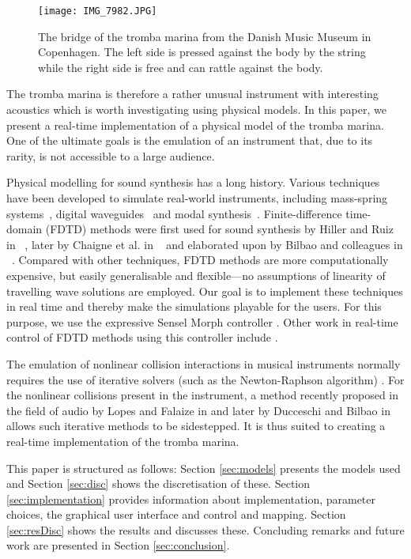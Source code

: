 \documentclass[dvipsnames, pdftex]{article}
\begin{document}
  \begin{figure}
  \centering
  \texttt{[image: IMG\_7982.JPG]}
  \caption{The bridge of the tromba marina from the Danish Music Museum in Copenhagen. The left side is pressed against the body by the string while the right side is free and can rattle against the body.}
  \label{fig:bridge}
\end{figure}

The tromba marina is therefore a rather unusual instrument with interesting acoustics which is worth investigating using  physical models. In this paper, we present a real-time implementation of a physical model of the tromba marina. One of the ultimate goals is the emulation of an instrument that, due to its rarity, is not accessible to a large audience.

Physical modelling for sound synthesis has a long history. Various techniques have been developed to simulate real-world instruments, including mass-spring systems~\cite{cadoz79}, digital waveguides~\cite{smith1992physical} and modal synthesis~\cite{morrison1993mosaic}.
Finite-difference time-domain (FDTD) methods were first used for sound synthesis by Hiller and Ruiz in ~\cite{Ruiz1969, Hiller1971, Hiller2}, later by Chaigne et al. in ~\cite{Chaigne92, Chaigne} and elaborated upon by Bilbao and colleagues in ~\cite{bilbao2009numerical, Bilbao2018:Tutorial}. Compared with other techniques, FDTD methods are more computationally expensive, but easily generalisable and flexible---no assumptions of linearity of travelling wave solutions are employed. Our goal is to implement these techniques in real time and thereby make the simulations playable for the users. For this purpose, we use the expressive Sensel Morph controller \cite{sensel2020}. Other work in real-time control of FDTD methods using this controller include \cite{Willemsen2019a:SMC2020, Willemsen2019c:SMC2020, Willemsen2019b:SMC2020}. 

The emulation of nonlinear collision interactions in musical instruments normally requires the use of iterative solvers (such as the Newton-Raphson algorithm) \cite{Bilbao15}. For the nonlinear collisions present in the instrument, a method recently proposed in the field of audio by Lopes and Falaize in \cite{Lopes:SMC2020, Falaize2016a:SMC2020, Falaize2016b:SMC2020} and later by Ducceschi and Bilbao in~\cite{Ducceschi2019} allows such iterative methods to be sidestepped. It is thus suited  to creating a real-time implementation of the tromba marina.

This paper is structured as follows: Section \ref{sec:models} presents the models used and Section \ref{sec:disc} shows the discretisation of these. Section \ref{sec:implementation} provides information about implementation, parameter choices, the graphical user interface and control and mapping. Section \ref{sec:resDisc} shows the results and discusses these. Concluding remarks and future work are presented in Section \ref{sec:conclusion}.
\end{document}

